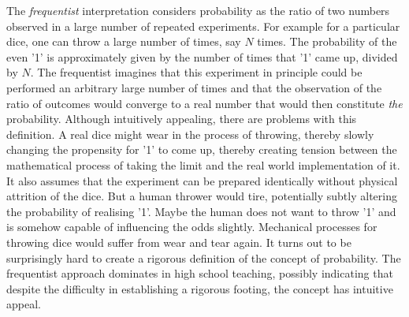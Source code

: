   
The \emph{frequentist} interpretation considers probability as the
ratio of two numbers observed in a large number of repeated experiments. For
example for a particular dice, one can throw a large number of times, say $N$ times.
The probability of the even '1' is approximately given by the number of times
that '1' came up, divided by $N$. The frequentist imagines that this experiment
in principle could be performed an arbitrary large number of times and that the
observation of the ratio of outcomes would converge to a real number that would
then constitute \emph{the} probability. Although intuitively appealing, there are
problems with this definition. A real dice might wear in the process of throwing,
thereby slowly changing the propensity for '1' to come up, thereby creating tension
between the mathematical process of taking the limit and the real world implementation
of it. It also assumes that the experiment can be prepared identically without
physical attrition of the dice. But a human thrower would tire, potentially subtly
altering the probability of realising '1'. Maybe the human does not want to throw '1'
and is somehow capable of influencing the odds slightly. Mechanical processes for
throwing dice would suffer from wear and tear again. It turns out to be surprisingly
hard to create a rigorous definition of the concept of probability. The frequentist
approach dominates in high school teaching, possibly indicating that despite the
difficulty in establishing a rigorous footing, the concept has intuitive appeal.

